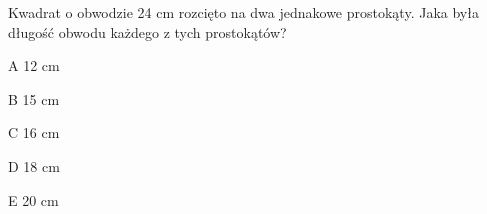 \begin{tresc}
Kwadrat o obwodzie 24 cm rozcięto na dwa jednakowe prostokąty. Jaka była długość obwodu każdego z tych prostokątów?
\end{tresc}
\begin{wariant}{A} 12 cm \end{wariant}
\begin{wariant}{B} 15 cm \end{wariant}
\begin{wariant}{C} 16 cm \end{wariant}
\begin{wariant}{D} 18 cm \end{wariant}
\begin{wariant}{E} 20 cm \end{wariant}
